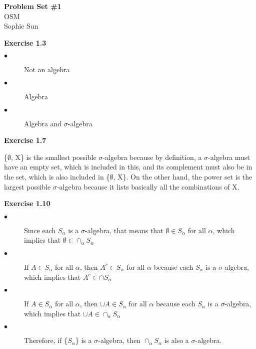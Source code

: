 \documentclass[letterpaper,12pt]{article}
\theoremstyle{definition}
\begin{document}
\begin{flushleft}
  \textbf{\large{Problem Set \#1}} \\
  OSM \\
  Sophie Sun
\end{flushleft}

\vspace{3mm}
\noindent\textbf{Exercise 1.3}
\begin{description}
  \item[$\bullet$] Not an algebra
  \item[$\bullet$] Algebra
  \item[$\bullet$] Algebra and $\sigma$-algebra
\end{description}

\noindent\textbf{Exercise 1.7} 
\begin{description}
\item \{$\emptyset$, X\} is the smallest possible $\sigma$-algebra because by definition, a $\sigma$-algebra must have an empty set, which is included in this, and its complement must also be in the set, which is also included in \{$\emptyset$, X\}. On the other hand, the power set is the largest possible $\sigma$-algebra because it lists basically all the combinations of X.
\end{description}

\vspace{3mm}
\noindent\textbf{Exercise 1.10}
\begin{description}
  \item[$\bullet$] Since each $S_\alpha$ is a $\sigma$-algebra, that means that $\emptyset \in S_\alpha$ for all $\alpha$, which implies that $\emptyset \in \cap_\alpha S_\alpha$
  \item[$\bullet$] If $A \in S_\alpha$ for all $\alpha$, then $A^c \in S_\alpha$ for all $\alpha$ because each $S_\alpha$ is a $\sigma$-algebra, which implies that $A^c \in \cap S_\alpha$
  \item[$\bullet$] If $A \in S_\alpha$ for all $\alpha$, then $\cup A \in S_\alpha$ for all $\alpha$ because each $S_\alpha$ is a $\sigma$-algebra, which implies that $\cup A \in \cap_\alpha S_\alpha$
  \item[$\bullet$] Therefore, if \{$S_\alpha$\} is a $\sigma$-algebra, then $\cap_\alpha S_\alpha$ is also a $\sigma$-algebra.
\end{description}
\end{document}
